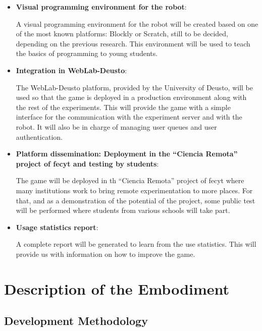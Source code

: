 \begin{itemize}
\item \textbf{Visual programming environment for the robot}:

A visual programming environment for the robot will be created based on one of the most known
platforms: Blockly or Scratch, still to be decided, depending on the previous research. This
environment will be used to teach the basics of programming to young students.

\item \textbf{Integration in WebLab-Deusto}:

The WebLab-Deusto platform, provided by the University of Deusto, will be used so that the game
is deployed in a production environment along with the rest of the experiments. This will provide
the game with a simple interface for the communication with the experiment server and with the
robot. It will also be in charge of managing user queues and user authentication.

\item \textbf{Platform dissemination: Deployment in the ``Ciencia Remota'' project of
\acrshort{fecyt} and testing by students}:

The game will be deployed in th ``Ciencia Remota'' project of \acrshort{fecyt} where many
institutions work to bring remote experimentation to more places. For that, and as a demonstration
of the potential of the project, some public test will be performed where students from various
schools will take part.

\item \textbf{Usage statistics report}:

A complete report will be generated to learn from the use statistics. This will provide us with
information on how to improve the game.

\end{itemize}

\section{Description of the Embodiment}

\subsection{Development Methodology}

